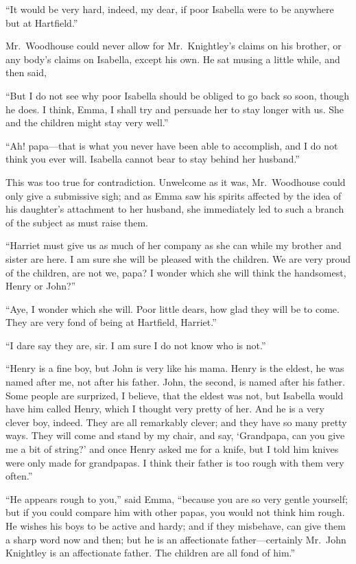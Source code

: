 ``It would be very hard, indeed, my dear, if poor Isabella were
to be anywhere but at Hartfield.''

Mr.\ Woodhouse could never allow for Mr.\ Knightley's claims on
his brother, or any body's claims on Isabella, except his own.
He sat musing a little while, and then said,

``But I do not see why poor Isabella should be obliged to go back
so soon, though he does.  I think, Emma, I shall try and persuade
her to stay longer with us.  She and the children might stay very well.''

``Ah! papa---that is what you never have been able to accomplish,
and I do not think you ever will.  Isabella cannot bear to stay
behind her husband.''

This was too true for contradiction.  Unwelcome as it was, Mr.\ Woodhouse
could only give a submissive sigh; and as Emma saw his spirits
affected by the idea of his daughter's attachment to her husband,
she immediately led to such a branch of the subject as must raise them.

``Harriet must give us as much of her company as she can while
my brother and sister are here.  I am sure she will be pleased
with the children.  We are very proud of the children, are not we,
papa? I wonder which she will think the handsomest, Henry or John?''

``Aye, I wonder which she will.  Poor little dears, how glad they
will be to come.  They are very fond of being at Hartfield, Harriet.''

``I dare say they are, sir.  I am sure I do not know who is not.''

``Henry is a fine boy, but John is very like his mama.  Henry is the eldest,
he was named after me, not after his father.  John, the second,
is named after his father.  Some people are surprized, I believe,
that the eldest was not, but Isabella would have him called Henry,
which I thought very pretty of her.  And he is a very clever boy,
indeed.  They are all remarkably clever; and they have so many
pretty ways.  They will come and stand by my chair, and say,
`Grandpapa, can you give me a bit of string?' and once Henry asked me
for a knife, but I told him knives were only made for grandpapas.
I think their father is too rough with them very often.''

``He appears rough to you,'' said Emma, ``because you are so very
gentle yourself; but if you could compare him with other papas,
you would not think him rough.  He wishes his boys to be active and hardy;
and if they misbehave, can give them a sharp word now and then;
but he is an affectionate father---certainly Mr.\ John Knightley
is an affectionate father.  The children are all fond of him.''

